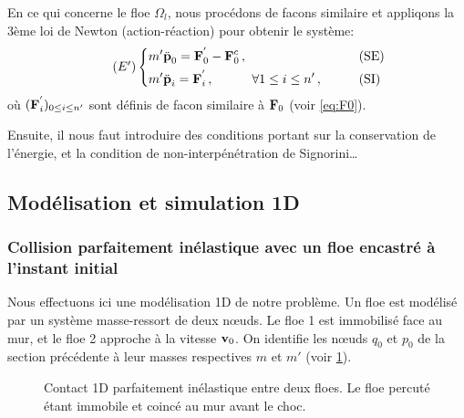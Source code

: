 En ce qui concerne le floe $\Omega_l$, nous procédons de facons similaire et appliqons la 3ème loi de Newton (action-réaction) pour obtenir le système:
\begin{align} \tag{$E'$} \label{eq:eprime}
\begin{dcases}
    m' \ddot{\bm{\mathrm{p}}}_0 = \bm{\mathrm{F}}^{'}_0 - \bm{\mathrm{F}}^c_0  \,, &\qquad \text{(SE)} \\
    m' \ddot{\bm{\mathrm{p}}}_i = \bm{\mathrm{F}}^{'}_i   \,, \quad \quad \quad \forall 1 \leq i \leq n' \,, &\qquad \text{(SI)}
\end{dcases}
\end{align}
où $(\bm{\mathrm{F}}^{'}_i)_{0 \leq i \leq n'}$ sont définis de facon similaire à $\bm{\mathrm{F}}_0$ (voir \cref{eq:F0}).

Ensuite, il nous faut introduire des conditions portant sur la conservation de l'énergie, et la condition de non-interpénétration de Signorini\dots



\subsection{Modélisation et simulation 1D}



\subsubsection{Collision parfaitement inélastique avec un floe encastré à l'instant initial}

Nous effectuons ici une modélisation 1D de notre problème. Un floe est modélisé par un système masse-ressort de deux nœuds. Le floe 1 est immobilisé face au mur, et le floe 2 approche à la vitesse $\bm{\mathrm{v}}_0$. On identifie les nœuds $q_0$ et $p_0$ de la section précédente à leur masses respectives $m$ et $m'$ (voir \cref{fig:contact1d}).
\begin{figure}[!h]
    \centering
    \caption{Contact 1D parfaitement inélastique entre deux floes. Le floe percuté étant immobile et coincé au mur avant le choc.}
    \label{fig:contact1d}
\end{figure}


